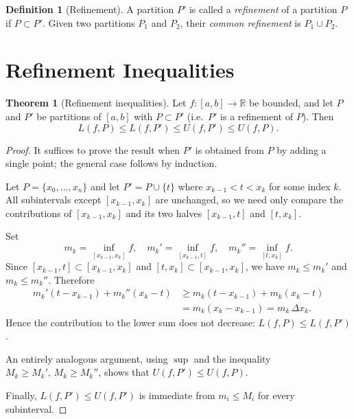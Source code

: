 \documentclass[12pt,a4paper]{book}
\theoremstyle{definition}
\newtheorem{definition}{Definition}[chapter]
\newtheorem{theorem}{Theorem}[chapter]
\newcommand{\R}{\mathbb{R}}
\begin{document}
\begin{definition}[Refinement]\label{def:refinement}
  A partition $P'$ is called a \emph{refinement} of a
  partition $P$ if $P\subset P'$.  Given two partitions $P_1$ and $P_2$,
  their \emph{common refinement} is $P_1\cup P_2$.
\end{definition}


\section{Refinement Inequalities}\label{sec:refinement-ineq}

\begin{theorem}[Refinement inequalities]\label{thm:refinement-ineq}
  Let $f\colon[a,b]\to\R$ be bounded, and let $P$ and $P'$ be partitions
  of $[a,b]$ with $P\subset P'$ (i.e.\ $P'$ is a refinement of $P$).
  Then
  \[
    L(f,P) \le L(f,P') \le U(f,P') \le U(f,P).
  \]
\end{theorem}

\begin{proof}
  It suffices to prove the result when $P'$ is obtained from $P$ by
  adding a single point; the general case follows by induction.

  Let $P=\{x_0,\ldots,x_n\}$ and let $P'=P\cup\{t\}$ where
  $x_{k-1}<t<x_k$ for some index $k$.  All subintervals except
  $[x_{k-1},x_k]$ are unchanged, so we need only compare the
  contributions of $[x_{k-1},x_k]$ and its two halves
  $[x_{k-1},t]$ and $[t,x_k]$.

  Set
  \[
    m_k  = \inf_{[x_{k-1},x_k]} f,\quad
    m_k' = \inf_{[x_{k-1},t]} f,\quad
    m_k''= \inf_{[t,x_k]} f.
  \]
  Since $[x_{k-1},t]\subset[x_{k-1},x_k]$ and
  $[t,x_k]\subset[x_{k-1},x_k]$, we have $m_k\le m_k'$ and
  $m_k\le m_k''$.  Therefore
  \begin{align*}
    m_k'(t-x_{k-1}) + m_k''(x_k-t)
    &\ge m_k(t-x_{k-1}) + m_k(x_k-t) \\
    &= m_k(x_k-x_{k-1}) = m_k\,\Delta x_k.
  \end{align*}
  Hence the contribution to the lower sum does not decrease:
  $L(f,P)\le L(f,P')$.

  An entirely analogous argument, using $\sup$ and the inequality
  $M_k\ge M_k',\, M_k\ge M_k''$, shows that $U(f,P')\le U(f,P)$.

  Finally, $L(f,P')\le U(f,P')$ is immediate from $m_i\le M_i$ for
  every subinterval.
\end{proof}
\end{document}
